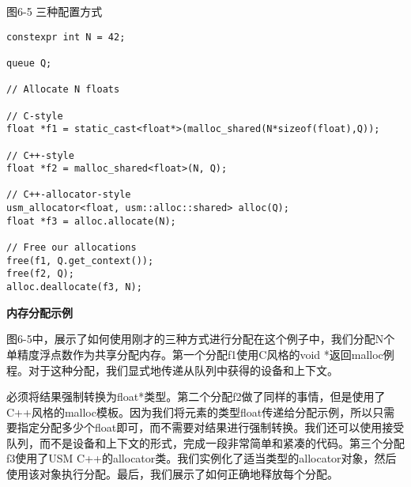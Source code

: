 \hspace*{\fill} \par %
图6-5 三种配置方式
\begin{lstlisting}[caption={}]
constexpr int N = 42;

queue Q;

// Allocate N floats

// C-style
float *f1 = static_cast<float*>(malloc_shared(N*sizeof(float),Q));

// C++-style
float *f2 = malloc_shared<float>(N, Q);

// C++-allocator-style
usm_allocator<float, usm::alloc::shared> alloc(Q);
float *f3 = alloc.allocate(N);

// Free our allocations
free(f1, Q.get_context());
free(f2, Q);
alloc.deallocate(f3, N);
\end{lstlisting}

\hspace*{\fill} \par %
\textbf{内存分配示例}

图6-5中，展示了如何使用刚才的三种方式进行分配在这个例子中，我们分配N个单精度浮点数作为共享分配内存。第一个分配f1使用C风格的void *返回malloc例程。对于这种分配，我们显式地传递从队列中获得的设备和上下文。\par

必须将结果强制转换为float*类型。第二个分配f2做了同样的事情，但是使用了C++风格的malloc模板。因为我们将元素的类型float传递给分配示例，所以只需要指定分配多少个float即可，而不需要对结果进行强制转换。我们还可以使用接受队列，而不是设备和上下文的形式，完成一段非常简单和紧凑的代码。第三个分配f3使用了USM C++的allocator类。我们实例化了适当类型的allocator对象，然后使用该对象执行分配。最后，我们展示了如何正确地释放每个分配。\par












































